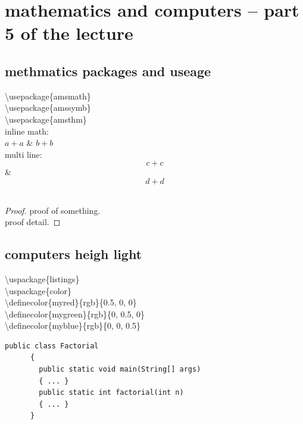 \documentclass[11pt,a4paper]{article}
\begin{document}
\section{mathematics and computers -- part 5 of the lecture}{
  \subsection{methmatics packages and useage}{
    \textbackslash{}usepackage\{amsmath\}\\
    \textbackslash{}usepackage\{amssymb\}\\
    \textbackslash{}usepackage\{amsthm\}\\
    inline math:\\
    \(a+a\) \& $b+b$\\
    multi line:\\
    \[c+c\] \& $$d+d$$\\
    \begin{proof}
      proof of something.\\
      proof detail.
    \end{proof}
  }
  \subsection{computers heigh light}{
    \textbackslash{}uspackage\{listings\}\\
    \textbackslash{}uspackage\{color\}\\
    
    \textbackslash{}definecolor\{myred\}\{rgb\}\{0.5, 0, 0\}\\
    \textbackslash{}definecolor\{mygreen\}\{rgb\}\{0, 0.5, 0\}\\
    \textbackslash{}definecolor\{myblue\}\{rgb\}\{0, 0, 0.5\}\\

    \lstset{style=customc}
    
    \begin{lstlisting}[frame=single]
      public class Factorial
      {
        public static void main(String[] args)
        { ... }
        public static int factorial(int n)
        { ... }
      }
    \end{lstlisting}
  }
}
\end{document}
